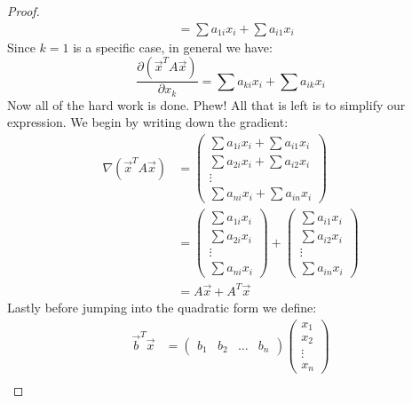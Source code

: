 \documentclass[12pt, letterpaper, onecolumn, conference, final]{IEEEtran}
\theoremstyle{definition}
\theoremstyle{plain}
\begin{document}
\begin{proof}
\begin{equation*}
\begin{split}
&= \sum a_{1i}x_i + \sum a_{i1}x_i 
\end{split}
\end{equation*}
Since $k = 1$ is a specific case, in general we have:
\begin{equation*}
\frac{\partial(\overrightarrow{x}^TA\overrightarrow{x})}{\partial x_k} = \sum a_{ki}x_i + \sum a_{ik}x_i 
\end{equation*}
Now all of the hard work is done. Phew! All that is left is to simplify our expression. We begin by writing down the gradient:
\renewcommand*{\arraystretch}{1.2}
\begin{equation*}
\begin{split}
\nabla (\overrightarrow{x}^TA\overrightarrow{x}) &= \begin{pmatrix}
\sum a_{1i}x_i + \sum a_{i1}x_i \\
\sum a_{2i}x_i + \sum a_{i2}x_i \\
\vdots \\
\sum a_{ni}x_i + \sum a_{in}x_i  
\end{pmatrix} \\
&= \begin{pmatrix}
\sum a_{1i}x_i \\
\sum a_{2i}x_i \\
\vdots \\
\sum a_{ni}x_i 
\end{pmatrix} + \begin{pmatrix}
\sum a_{i1}x_i \\
\sum a_{i2}x_i \\
\vdots \\
\sum a_{in}x_i  
\end{pmatrix} \\
&= A\overrightarrow{x} + A^T\overrightarrow{x}
\end{split}
\end{equation*}
Lastly before jumping into the quadratic form we define:
\renewcommand*{\arraystretch}{1.2}
\begin{equation*}
\begin{split}
\overrightarrow{b}^T \overrightarrow{x} &= \begin{pmatrix}
b_1 & b_2 & \dots & b_n
\end{pmatrix} \begin{pmatrix}
x_1 \\
x_2 \\
\vdots \\
x_n
\end{pmatrix} \\

\end{split}
\end{equation*}
\end{proof}
\end{document}
